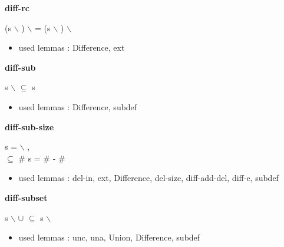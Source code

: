 \documentclass[a4paper]{article}
\begin{document}
\medskip

\bigskip

{\large\bf diff-rc}

\medskip

 \Fol (s $\backslash$ ) $\backslash$  = (s $\backslash$ ) $\backslash$ 

\begin{itemize}


\item       used lemmas  : Difference, ext

\end{itemize}

\medskip

\bigskip

{\large\bf diff-sub}

\medskip

 \Fol s $\backslash$  $\subseteq$ s

\begin{itemize}


\item       used lemmas  : Difference, subdef

\end{itemize}

\medskip

\bigskip

{\large\bf diff-sub-size}

\medskip

s =  $\backslash$ , \\
 $\subseteq$  \Fol \# s = \#  - \# 

\begin{itemize}


\item       used lemmas  : del-in, ext, Difference, del-size, diff-add-del, diff-e, subdef

\end{itemize}

\medskip

\bigskip

{\large\bf diff-subset}

\medskip

 \Fol s $\backslash$  $\cup$  $\subseteq$ s $\backslash$ 

\begin{itemize}


\item       used lemmas  : unc, una, Union, Difference, subdef

\end{itemize}
\end{document}
